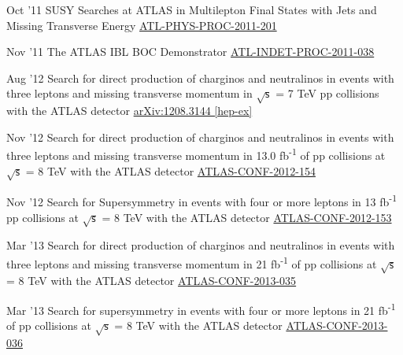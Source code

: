 \documentclass[]{cv} %
\begin{document}
\begin{entrylist}

  \entry
  {Oct '11}
  {{\normalfont SUSY Searches at ATLAS in Multilepton Final States with Jets and Missing Transverse Energy}}
  {\href{https://cds.cern.ch/record/1394331}{ATL-PHYS-PROC-2011-201}}
  {\vspace*{\spacingPubs}}

  \entry
  {Nov '11}
  {{\normalfont The ATLAS IBL BOC Demonstrator}}
  {\href{https://cds.cern.ch/record/1401224}{ATL-INDET-PROC-2011-038}}
  {\vspace*{\spacingPubs}}

  \entry
  {Aug '12}
  {{\normalfont Search for direct production of charginos and neutralinos in events with three leptons and missing transverse momentum in $\sqrt{\mathsf{s}}$ =
  7 TeV pp collisions with the ATLAS detector}}
  {\href{http://arxiv.org/abs/1208.3144}{arXiv:1208.3144 [hep-ex]}}
  {\vspace*{\spacingPubs}}

  \entry
  {Nov '12}
  {{\normalfont Search for direct production of charginos and neutralinos in events with three leptons and missing transverse momentum in 13.0
  fb\textsuperscript{-1} of pp collisions at $\sqrt{\mathsf{s}}$ = 8 TeV with the ATLAS detector}}
  {\href{https://cds.cern.ch/record/1493493}{ATLAS-CONF-2012-154}}
  {\vspace*{\spacingPubs}}

  \entry
  {Nov '12}
  {{\normalfont Search for Supersymmetry in events with four or more leptons in 13 fb\textsuperscript{-1} pp collisions at $\sqrt{\mathsf{s}}$
  = 8 TeV with the ATLAS detector}}
  {\href{https://cds.cern.ch/record/1493492}{ATLAS-CONF-2012-153}}
  {\vspace*{\spacingPubs}}

  \entry
  {Mar '13}
  {{\normalfont Search for direct production of charginos and neutralinos in events with three leptons and missing transverse momentum in 21
    fb\textsuperscript{-1} of pp
  collisions at $\sqrt{\mathsf{s}}$ = 8 TeV with the ATLAS detector}}
  {\href{https://cds.cern.ch/record/1532426}{ATLAS-CONF-2013-035}}
  {\vspace*{\spacingPubs}}

  \entry
  {Mar '13}
  {{\normalfont Search for supersymmetry in events with four or more leptons in 21 fb\textsuperscript{-1} of pp collisions at
  $\sqrt{\mathsf{s}}$ = 8 TeV with the ATLAS detector}}
{\href{https://cds.cern.ch/record/1532429}{ATLAS-CONF-2013-036}}
{\vspace*{\spacingPubs}}


\end{entrylist}
\end{document}
